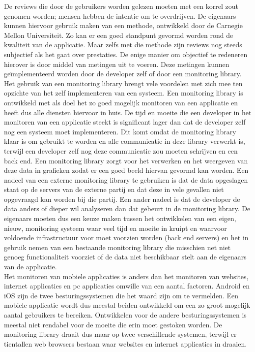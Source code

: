 De reviews die door de gebruikers worden gelezen moeten met een korrel zout genomen worden; mensen hebben de intentie om te overdrijven. De eigenaars kunnen hiervoor gebruik maken van een methode, ontwikkeld door de Carnegie Mellon Universiteit. Zo kan er een goed standpunt gevormd worden rond de kwaliteit van de applicatie. Maar zelfs met die methode zijn reviews nog steeds subjectief als het gaat over prestaties. De enige manier om objectief te redeneren hierover is door middel van metingen uit te voeren. Deze metingen kunnen ge\"implementeerd worden door de developer zelf of door een monitoring library. Het gebruik van een monitoring library brengt vele voordelen met zich mee ten opzichte van het zelf implementeren van een systeem. Een monitoring library is ontwikkeld met als doel het zo goed mogelijk monitoren van een applicatie en heeft dus alle diensten hiervoor in huis. De tijd en moeite die een developer in het monitoren van een applicatie steekt is significant lager dan dat de developer zelf nog een systeem moet implementeren. Dit komt omdat de monitoring library klaar is om gebruikt te worden en alle communicatie in deze library verwerkt is, terwijl een developer zelf nog deze communicatie zou moeten schrijven en een back end. Een monitoring library zorgt voor het verwerken en het weergeven van deze data in grafieken zodat er een goed beeld hiervan gevormd kan worden. Een nadeel van een externe monitoring library te gebruiken is dat de data opgeslagen staat op de servers van de externe partij en dat deze in vele gevallen niet opgevraagd kan worden bij die partij. Een ander nadeel is dat de developer de data anders of dieper wil analyseren dan dat gebeurt in de monitoring library. De eigenaars moeten dus een keuze maken tussen het ontwikkelen van een eigen, nieuw, monitoring systeem waar veel tijd en moeite in kruipt en waarvoor voldoende infrastructuur voor moet voorzien worden (back end servers) en het in gebruik nemen van een bestaande monitoring library die misschien net niet genoeg functionaliteit voorziet of de data niet beschikbaar stelt aan de eigenaars van de applicatie.\\


Het monitoren van mobiele applicaties is anders dan het monitoren van websites, internet applicaties en pc applicaties omwille van een aantal factoren. Android en iOS zijn de twee besturingssystemen die het waard zijn om te vermelden. Een mobiele applicatie wordt dus meestal beiden ontwikkeld om een zo groot mogelijk aantal gebruikers te bereiken. Ontwikkelen voor de andere besturingssystemen is meestal niet rendabel voor de moeite die erin moet gestoken worden. De monitoring library draait dus maar op twee verschillende systemen, terwijl er tientallen web browsers bestaan waar websites en internet applicaties in draaien. 

